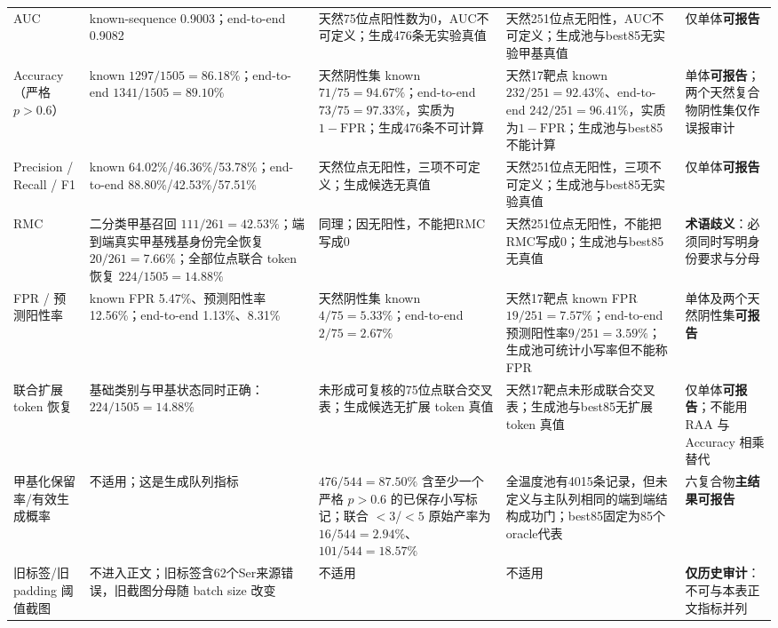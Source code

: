 \begin{landscape}
\begin{longtable}{L{27mm}L{46mm}L{50mm}L{48mm}L{43mm}}
AUC
& known-sequence 0.9003；end-to-end 0.9082
& 天然75位点阳性数为0，AUC不可定义；生成476条无实验真值
& 天然251位点无阳性，AUC不可定义；生成池与best85无实验甲基真值
& 仅单体\textbf{可报告} \\

Accuracy（严格 $p>0.6$）
& known $1297/1505=86.18\%$；end-to-end $1341/1505=89.10\%$
& 天然阴性集 known $71/75=94.67\%$；end-to-end $73/75=97.33\%$，实质为 $1-\mathrm{FPR}$；生成476条不可计算
& 天然17靶点 known $232/251=92.43\%$、end-to-end $242/251=96.41\%$，实质为$1-\mathrm{FPR}$；生成池与best85不能计算
& 单体\textbf{可报告}；两个天然复合物阴性集仅作误报审计 \\

Precision / Recall / F1
& known 64.02\%/46.36\%/53.78\%；end-to-end 88.80\%/42.53\%/57.51\%
& 天然位点无阳性，三项不可定义；生成候选无真值
& 天然251位点无阳性，三项不可定义；生成池与best85无实验真值
& 仅单体\textbf{可报告} \\

RMC
& 二分类甲基召回 $111/261=42.53\%$；端到端真实甲基残基身份完全恢复 $20/261=7.66\%$；全部位点联合 token 恢复 $224/1505=14.88\%$
& 同理；因无阳性，不能把RMC写成0
& 天然251位点无阳性，不能把RMC写成0；生成池与best85无真值
& \textbf{术语歧义}：必须同时写明身份要求与分母 \\

FPR / 预测阳性率
& known FPR 5.47\%、预测阳性率12.56\%；end-to-end 1.13\%、8.31\%
& 天然阴性集 known $4/75=5.33\%$；end-to-end $2/75=2.67\%$
& 天然17靶点 known FPR $19/251=7.57\%$；end-to-end预测阳性率$9/251=3.59\%$；生成池可统计小写率但不能称FPR
& 单体及两个天然阴性集\textbf{可报告} \\

联合扩展 token 恢复
& 基础类别与甲基状态同时正确：$224/1505=14.88\%$
& 未形成可复核的75位点联合交叉表；生成候选无扩展 token 真值
& 天然17靶点未形成联合交叉表；生成池与best85无扩展 token 真值
& 仅单体\textbf{可报告}；不能用 RAA 与 Accuracy 相乘替代 \\

甲基化保留率/有效生成概率
& 不适用；这是生成队列指标
& $476/544=87.50\%$ 含至少一个严格 $p>0.6$ 的已保存小写标记；联合 $<3$/$<5$ 原始产率为 $16/544=2.94\%$、$101/544=18.57\%$
& 全温度池有4015条记录，但未定义与主队列相同的端到端结构成功门；best85固定为85个oracle代表
& 六复合物\textbf{主结果可报告} \\

旧标签/旧 padding 阈值截图
& 不进入正文；旧标签含62个Ser来源错误，旧截图分母随 batch size 改变
& 不适用
& 不适用
& \textbf{仅历史审计}：不可与本表正文指标并列 \\

\end{longtable}
\endgroup
\end{landscape}

